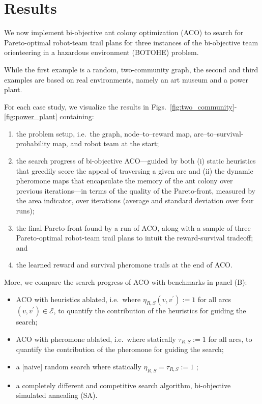 \documentclass[fleqn,10pt,lineno]{wlpeerj}
\begin{document}
\section{Results}
We now implement bi-objective ant colony optimization (ACO) to search for Pareto-optimal robot-team trail plans for three instances of the bi-objective team orienteering in a hazardous environment (BOTOHE) problem.

While the first example is a random, two-community graph, the second and third examples are based on real environments, namely an art museum and a power plant.

For each case study, we visualize the results in Figs.~\ref{fig:two_community}-\ref{fig:power_plant} containing:
\begin{enumerate}[noitemsep, label=(\Alph*)]
\item the problem setup, i.e.\ the graph, node--to--reward map, arc--to--survival-probability map, and robot team at the start;
\item the search progress of bi-objective ACO---guided by both (i) static heuristics that greedily score the appeal of traversing a given arc and (ii) the dynamic pheromone maps that encapsulate the memory of the ant colony over previous iterations---in terms of the quality of the Pareto-front, measured by the area indicator, over iterations (average and standard deviation over four runs);
\item the final Pareto-front found by a run of ACO, along with a sample of three Pareto-optimal robot-team trail plans to intuit the reward-survival tradeoff; and
\item the learned reward and survival pheromone trails at the end of ACO.
\end{enumerate}
More, we compare the search progress of ACO with benchmarks in panel (B): 
\begin{itemize}[noitemsep]
\item ACO with heuristics ablated, i.e.\ where $\eta_{R, S}(v, v^\prime):=1$ for all arcs $(v, v^\prime)\in\mathcal{E}$, to quantify the contribution of the heuristics for guiding the search;
\item ACO with pheromone ablated, i.e.\ where statically $\tau_{R, S}:=1$ for all arcs, to quantify the contribution of the pheromone for guiding the search;
\item a [naive] random search where statically $\eta_{R, S}=\tau_{R,S}:=1$ ;
\item a completely different and competitive search algorithm, bi-objective simulated annealing (SA).
\end{itemize}
\end{document}
